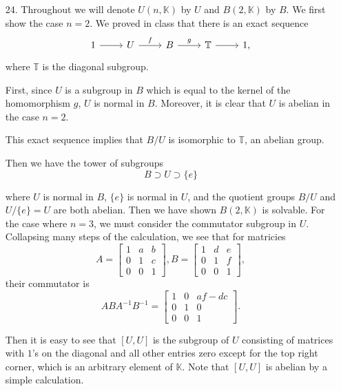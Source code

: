 \documentclass[11pt, reqno]{article}
\theoremstyle{plain}
\theoremstyle{definition}
\theoremstyle{remark}
\begin{document}
\begin{enumerate}
    \item[24.] Throughout we will denote $U(n, \mathbb{K})$ by $U$ and $B(2,\mathbb{K})$ by $B$.
    We first show the case $n = 2$. We proved in class that there is an exact sequence 
    \begin{equation*}
        \begin{tikzcd}
            1 \arrow[r] & U \arrow[r, "f"] & B \arrow[r, "g"] & \mathbb{T} \arrow[r] & 1,
        \end{tikzcd}
    \end{equation*}
    where $\mathbb{T}$ is the diagonal subgroup. 

    First, since $U$ is a subgroup in $B$ which is equal to the kernel of the homomorphism $g$, $U$ is normal in $B$.
    Moreover, it is clear that $U$ is abelian in the case $n = 2$. 

    This exact sequence implies that $B/U$ is isomorphic to $\mathbb{T}$, an abelian group. 
    
    Then we have the tower of subgroups 
    \[
        B \supset U \supset \{e\}
    \]

    where $U$ is normal in $B$, $\{e\}$ is normal in $U$, and the quotient groups $B/U$ and $U/\{e\} = U$
    are both abelian. Then we have shown $B(2, \mathbb{K})$ is solvable.
    \bigbreak
    For the case where $n = 3$, we must consider the commutator subgroup in $U$. Collapsing many steps of 
    the calculation, we see that for matricies 
    \[
        A = \begin{bmatrix}
            1 & a & b \\
            0 & 1 & c\\
            0 & 0 & 1
        \end{bmatrix}, 
        B = \begin{bmatrix}
            1 & d & e \\
            0 & 1 & f \\
            0 & 0 & 1
        \end{bmatrix},
    \]
    their commutator is 
    \[
        ABA^{-1}B^{-1} = \begin{bmatrix}
            1 & 0 & af - dc \\
            0 & 1 & 0 \\
            0 & 0 & 1 
        \end{bmatrix}.
    \]

    Then it is easy to see that $[U, U]$ is the subgroup of $U$ consisting of matrices with $1$'s on the 
    diagonal and all other entries zero except for the top right corner, which is an arbitrary element of 
    $\mathbb{K}$. Note that $[U, U]$ is abelian by a simple calculation. 


\end{enumerate}
\end{document}
